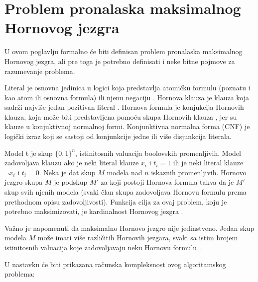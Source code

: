 \documentclass[12pt,oneside]{memoir}
\begin{document}
\newpage



\section{Problem pronalaska maksimalnog Hornovog jezgra}
U ovom poglavlju formalno će biti definisan problem pronalaska maksimalnog Hornovog jezgra, ali pre toga je potrebno definisati i neke bitne pojmove za razumevanje problema.

Literal je osnovna jedinica u logici koja predstavlja atomičku formulu (poznatu i kao atom ili osnovna formula) ili njenu negaciju \cite{doc_lit}.  Hornova klauza je klauza koja sadrži najviše jedan pozitivan literal \cite{doc_horn_clause}. Hornova formula je konjukcija Hornovih klauza, koja može biti predstavljena pomoću skupa Hornovih klauza \cite{doc3}, jer su klauze u konjuktivnoj normalnoj formi. Konjunktivna normalna forma (CNF) je logički izraz koji se sastoji od konjunkcije jedne ili više disjunkcija literala.


Model t je skup $\{0, 1\}^n$, istinitosnih valuacija boolovskih promenljivih. Model zadovoljava klauzu ako je neki literal klauze $x_i$ i $t_i=1$ ili je neki literal klauze $\neg x_i$ i $t_i=0$. Neka je dat skup $M$ modela nad $n$ iskaznih promenljivih. Hornovo jezgro skupa $M$ je podskup $M'$ za koji postoji Hornova formula takva da je $M'$ skup svih njenih modela (svaki član skupa zadovoljava Hornovu formulu prema prethodnom opisu zadovoljivosti). Funkcija cilja za ovaj problem, koju je potrebno maksimizovati, je kardinalnost Hornovog jezgra \cite{doc3,HCproblem}.

Važno je napomenuti da maksimalno Hornovo jezgro nije jedinstveno. Jedan skup modela $M$ može imati više različitih Hornovih jezgara, svaki sa istim brojem istinitosnih valuacija koje zadovoljavaju neku Hornovu formulu \cite{doc3}.

U nastavku će biti prikazana računska kompleksnost ovog algoritamskog problema:
\end{document}
